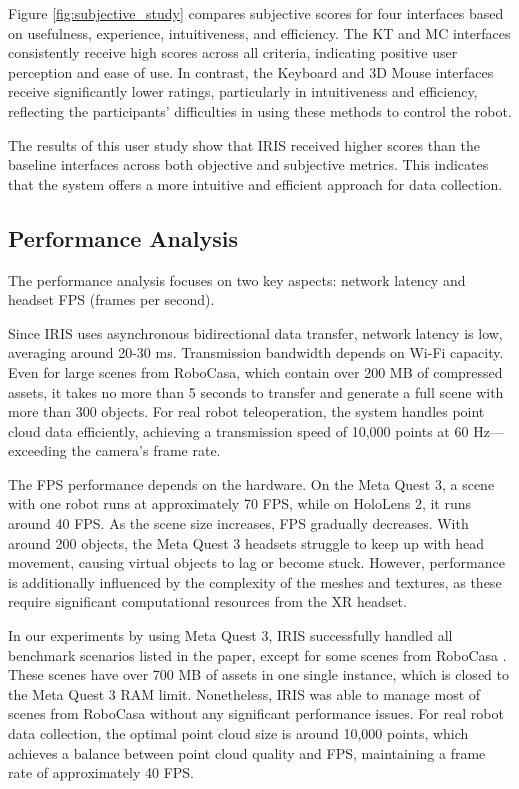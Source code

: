 

Figure \ref{fig:subjective_study} compares subjective scores for four interfaces based on usefulness, experience, intuitiveness, and efficiency.
The KT and MC interfaces consistently receive high scores across all criteria, indicating positive user perception and ease of use. 
In contrast, the Keyboard and 3D Mouse interfaces receive significantly lower ratings, particularly in intuitiveness and efficiency, reflecting the participants' difficulties in using these methods to control the robot.

The results of this user study show that IRIS received higher scores than the baseline interfaces across both objective and subjective metrics.
This indicates that the system offers a more intuitive and efficient approach for data collection.

\subsection{Performance Analysis}

The performance analysis focuses on two key aspects: network latency and headset FPS (frames per second).

Since IRIS uses asynchronous bidirectional data transfer, network latency is low, averaging around 20-30 ms. Transmission bandwidth depends on Wi-Fi capacity. Even for large scenes from RoboCasa, which contain over 200 MB of compressed assets, it takes no more than 5 seconds to transfer and generate a full scene with more than 300 objects. For real robot teleoperation, the system handles point cloud data efficiently, achieving a transmission speed of 10,000 points at 60 Hz—exceeding the camera’s frame rate.

The FPS performance depends on the hardware. On the Meta Quest 3, a scene with one robot runs at approximately 70 FPS, while on HoloLens 2, it runs around 40 FPS. As the scene size increases, FPS gradually decreases. With around 200 objects, the Meta Quest 3 headsets struggle to keep up with head movement, causing virtual objects to lag or become stuck. However, performance is additionally influenced by the complexity of the meshes and textures, as these require significant computational resources from the XR headset.

In our experiments by using Meta Quest 3, IRIS successfully handled all benchmark scenarios listed in the paper, except for some scenes from RoboCasa \cite{nasiriany2024robocasa}. These scenes have over 700 MB of assets in one single instance, which is closed to the Meta Quest 3 RAM limit. Nonetheless, IRIS was able to manage most of scenes from RoboCasa without any significant performance issues.
For real robot data collection, the optimal point cloud size is around 10,000 points, which achieves a balance between point cloud quality and FPS, maintaining a frame rate of approximately 40 FPS.




